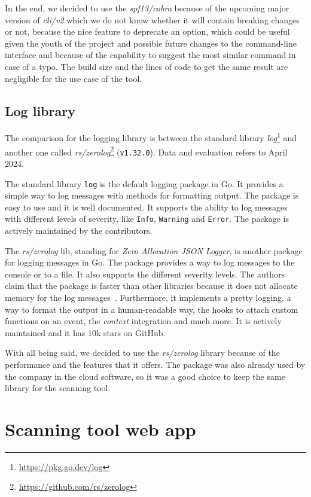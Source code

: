In the end, we decided to use the \textit{spf13/cobra} because of the upcoming major version of \textit{cli/v2} which we do not know whether it will contain breaking changes or not, because the nice feature to deprecate an option, which could be useful given the youth of the project and possible future changes to the command-line interface and because of the capability to suggest the most similar command in case of a typo. The build size and the lines of code to get the same result are negligible for the use case of the tool.

\subsection{Log library}

The comparison for the logging library is between the standard library \textit{log}\footnote{\url{https://pkg.go.dev/log}} and another one called \textit{rs/zerolog}\footnote{\url{https://github.com/rs/zerolog}} (\texttt{v1.32.0}). Data and evaluation refers to April 2024.

The standard library \texttt{log} is the default logging package in Go. It provides a simple way to log messages with methods for formatting output. The package is easy to use and it is well documented. It supports the ability to log messages with different levels of severity, like \texttt{Info}, \texttt{Warning} and \texttt{Error}. The package is actively maintained by the contributors.

The \textit{rs/zerolog} lib, standing for \textit{Zero Allocation JSON Logger}, is another package for logging messages in Go. The package provides a way to log messages to the console or to a file. It also supports the different severity levels. The authors claim that the package is faster than other libraries because it does not allocate memory for the log messages~\cite{go-zerolog-benchmarks}. Furthermore, it implements a pretty logging, a way to format the output in a human-readable way, the hooks to attach custom functions on an event, the \textit{context} integration and much more. It is actively maintained and it has 10k stars on GitHub.

With all being said, we decided to use the \textit{rs/zerolog} library because of the performance and the features that it offers. The package was also already used by the company in the cloud software, so it was a good choice to keep the same library for the scanning tool.

\section{Scanning tool web app}

